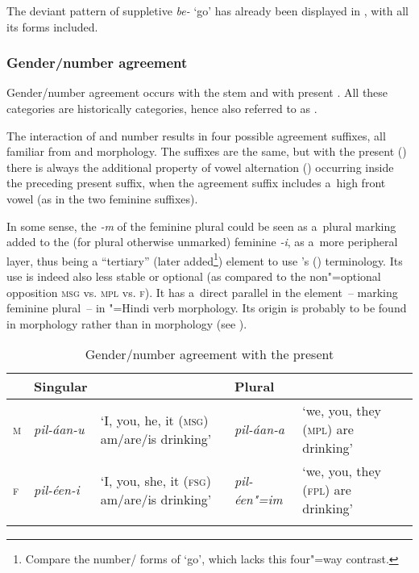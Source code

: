 The deviant pattern of suppletive \textit{be-} `go' has already been displayed in , with all its  forms included.


\subsubsection*{Gender/number agreement}

Gender/number agreement occurs with the  stem and with present . All these categories
are historically  categories, hence also referred to as 
\citep[260]{masica1991}.



The interaction of  and number results in four possible agreement suffixes, all familiar from  and  morphology. The suffixes are the same, but with the present () there is always the additional property of vowel alternation () occurring inside the preceding present  suffix, when the agreement suffix includes a~high front vowel (as in the two feminine suffixes).



In some sense, the \textit{-m} of the feminine plural could be seen as a~plural marking added to the (for plural otherwise unmarked) feminine \textit{-i}, as a~more peripheral layer, thus being a ``tertiary'' (later added\footnote{Compare the number/ forms of `go', which lacks this four"=way contrast.}) element to use \citeauthor{masica1991}'s (\citeyear[260--261]{masica1991}) terminology. Its use is indeed also less stable or optional (as compared to the non"=optional opposition \textsc{msg} vs. \textsc{mpl} vs. \textsc{f}). It has a~direct parallel in the  element~-- marking feminine plural~-- in "=Hindi verb morphology. Its origin is probably to be found in  morphology rather than in  morphology (see ).


\begin{table}[ht]
\caption{Gender/number agreement with the present}
\begin{tabularx}{\textwidth}{ l l Q l Q }
\lsptoprule
&
Singular &
&
Plural &
\\\hline
\textsc{m} &
\textit{pil-áan-u} &
`I, you, he, it (\textsc{msg}) am/are/is drinking' &
\textit{pil-áan-a} &
`we, you, they (\textsc{mpl}) are drinking'\\
\textsc{f} &
\textit{pil-éen-i} &
`I, you, she, it (\textsc{fsg}) am/are/is drinking' &
\textit{pil-éen"=im} &
`we, you, they (\textsc{fpl}) are drinking'\\\lspbottomrule
\end{tabularx}
\label{tab:8-18}
\end{table}


